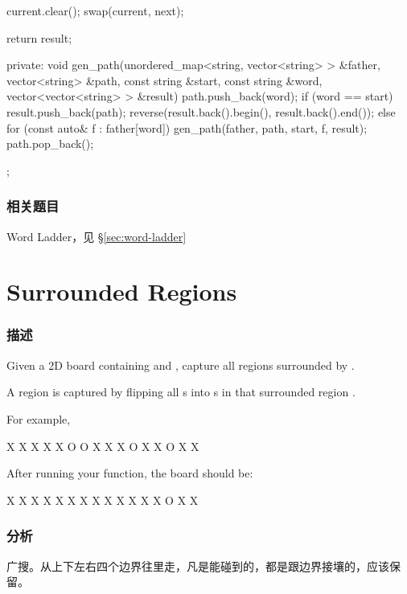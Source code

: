 \begin{Code}
{{{            current.clear();
            swap(current, next);
        }

        return result;
    }
private:
    void gen_path(unordered_map<string, vector<string> > &father,
            vector<string> &path, const string &start, const string &word,
            vector<vector<string> > &result) {
        path.push_back(word);
        if (word == start) {
            result.push_back(path);
            reverse(result.back().begin(), result.back().end());
        } else {
            for (const auto& f : father[word]) {
                gen_path(father, path, start, f, result);
            }
        }
        path.pop_back();
    }
};
\end{Code}


\subsubsection{相关题目}

\begindot
\item Word Ladder，见 \S \ref{sec:word-ladder}
\myenddot


\section{Surrounded Regions} %
\label{sec:surrounded-regions}


\subsubsection{描述}
Given a 2D board containing  and , capture all regions surrounded by .

A region is captured by flipping all s into s in that surrounded region .

For example,
\begin{Code}
X X X X
X O O X
X X O X
X O X X
\end{Code}

After running your function, the board should be:
\begin{Code}
X X X X
X X X X
X X X X
X O X X
\end{Code}


\subsubsection{分析}
广搜。从上下左右四个边界往里走，凡是能碰到的，都是跟边界接壤的，应该保留。


